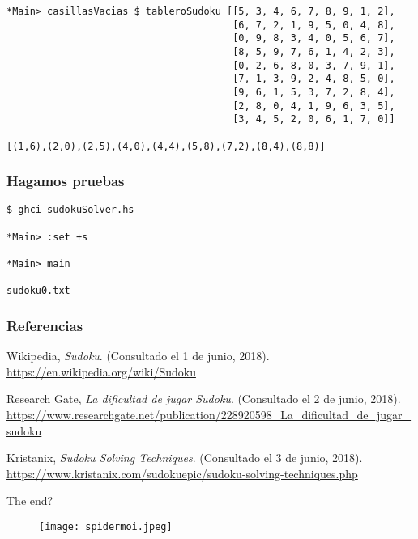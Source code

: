 \documentclass{beamer}
\begin{document}
\begin{frame}[fragile]
\begin{verbatim}
*Main> casillasVacias $ tableroSudoku [[5, 3, 4, 6, 7, 8, 9, 1, 2], 
                                       [6, 7, 2, 1, 9, 5, 0, 4, 8], 
                                       [0, 9, 8, 3, 4, 0, 5, 6, 7], 
                                       [8, 5, 9, 7, 6, 1, 4, 2, 3], 
                                       [0, 2, 6, 8, 0, 3, 7, 9, 1], 
                                       [7, 1, 3, 9, 2, 4, 8, 5, 0], 
                                       [9, 6, 1, 5, 3, 7, 2, 8, 4], 
                                       [2, 8, 0, 4, 1, 9, 6, 3, 5], 
                                       [3, 4, 5, 2, 0, 6, 1, 7, 0]]

[(1,6),(2,0),(2,5),(4,0),(4,4),(5,8),(7,2),(8,4),(8,8)]
\end{verbatim}
\end{frame}


\begin{frame}[fragile]
\frametitle{Hagamos pruebas}
\begin{verbatim}
$ ghci sudokuSolver.hs 

*Main> :set +s

*Main> main

sudoku0.txt
\end{verbatim}
\end{frame}


\begin{frame}
\frametitle{Referencias}
\footnotesize{
\begin{thebibliography}{99} %
 Wikipedia, \emph{Sudoku}.
\newblock (Consultado el 1 de junio, 2018).
\newblock \url{https://en.wikipedia.org/wiki/Sudoku}

\bibitem[]{} Research Gate, \emph{La dificultad de jugar Sudoku}. \newblock (Consultado el 2 de junio, 2018).
\newblock \url{https://www.researchgate.net/publication/228920598_La_dificultad_de_jugar_sudoku}

\bibitem[]{} Kristanix, \emph{Sudoku Solving Techniques}.
\newblock (Consultado el 3 de junio, 2018).
\newblock \url{https://www.kristanix.com/sudokuepic/sudoku-solving-techniques.php}

\end{thebibliography}
}
\end{frame}


\begin{frame}
\Huge{\centerline{The end?}}
\begin{figure}[H]
  \centering
  \texttt{[image: spidermoi.jpeg]}
\end{figure}
\end{frame}

\end{document}
